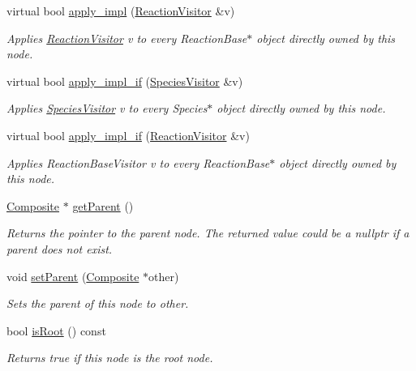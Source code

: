 \begin{DoxyCompactItemize}
virtual bool \hyperlink{classchem_1_1Component_a6db30c430a0eec9b0891cf3fc635ae1a}{apply\-\_\-impl} (\hyperlink{classchem_1_1ReactionVisitor}{Reaction\-Visitor} \&v)
\begin{DoxyCompactList}\small\item\em Applies \hyperlink{classchem_1_1ReactionVisitor}{Reaction\-Visitor} v to every Reaction\-Base$\ast$ object directly owned by this node. \end{DoxyCompactList}\item 
virtual bool \hyperlink{classchem_1_1Component_a7e28efdd01ed9613ebb7fad8e3a24b07}{apply\-\_\-impl\-\_\-if} (\hyperlink{classchem_1_1SpeciesVisitor}{Species\-Visitor} \&v)
\begin{DoxyCompactList}\small\item\em Applies \hyperlink{classchem_1_1SpeciesVisitor}{Species\-Visitor} v to every Species$\ast$ object directly owned by this node. \end{DoxyCompactList}\item 
virtual bool \hyperlink{classchem_1_1Component_a9d22fee87e12e9dbe66ad7fe7e6df130}{apply\-\_\-impl\-\_\-if} (\hyperlink{classchem_1_1ReactionVisitor}{Reaction\-Visitor} \&v)
\begin{DoxyCompactList}\small\item\em Applies Reaction\-Base\-Visitor v to every Reaction\-Base$\ast$ object directly owned by this node. \end{DoxyCompactList}\item 
\hyperlink{classchem_1_1Composite}{Composite} $\ast$ \hyperlink{classchem_1_1Component_a32812270ee52f07ceae2194c56864fd6}{get\-Parent} ()
\begin{DoxyCompactList}\small\item\em Returns the pointer to the parent node. The returned value could be a nullptr if a parent does not exist. \end{DoxyCompactList}\item 
void \hyperlink{classchem_1_1Component_a1f4e4d1566f1d3026f1e2a14fa3dffd9}{set\-Parent} (\hyperlink{classchem_1_1Composite}{Composite} $\ast$other)
\begin{DoxyCompactList}\small\item\em Sets the parent of this node to other. \end{DoxyCompactList}\item 
bool \hyperlink{classchem_1_1Component_a75cd13a0d884f82fcddd574de33fbfe6}{is\-Root} () const 
\begin{DoxyCompactList}\small\item\em Returns true if this node is the root node. \end{DoxyCompactList}\item 

\end{DoxyCompactItemize}
